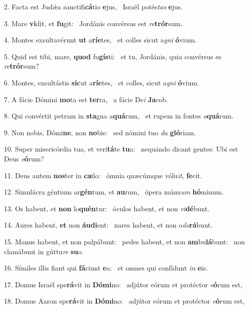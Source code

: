 2. Facta est Judǽa sanctifi\textbf{cá}tio \textbf{e}jus, \ast\  Israël potés\textit{tas} \textbf{e}jus.\

3. Mare \textbf{vi}dit, et \textbf{fu}git: \ast\  Jordánis convérsus est \textit{re}\textbf{trór}sum.\

4. Montes exsultavérunt \textbf{ut} a\textbf{rí}\textbf{e}tes, \ast\  et colles sicut a\textit{gni} \textbf{ó}vium.\

5. Quid est tibi, mare, \textbf{quod} fu\textbf{gís}ti: \ast\  et tu, Jordánis, quia convérsus es \textit{re}\textbf{trór}sum?\

6. Montes, exsultástis \textbf{sic}ut a\textbf{rí}\textbf{e}tes, \ast\  et colles, sicut a\textit{gni} \textbf{ó}vium.\

7. A fácie Dómini \textbf{mo}ta est \textbf{ter}ra, \ast\  a fácie De\textit{i} \textbf{Ja}cob.\

8. Qui convértit petram in \textbf{sta}gna a\textbf{quá}rum, \ast\  et rupem in fontes \textit{a}\textbf{quá}rum.\

9. Non nobis, Dómi\textbf{ne}, non \textbf{no}bis: \ast\  sed nómini tuo \textit{da} \textbf{gló}riam.\

10. Super misericórdia tua, et veri\textbf{tá}te \textbf{tu}a: \ast\  nequándo dicant gentes: Ubi est Deus \textit{e}\textbf{ó}rum?\

11. Deus autem \textbf{nos}ter in \textbf{cæ}lo: \ast\  ómnia quæcúmque vólu\textit{it}, \textbf{fe}cit.\

12. Simulácra géntium ar\textbf{gén}tum, et \textbf{au}rum, \ast\  ópera mánu\textit{um} \textbf{hó}minum.\

13. Os habent, et \textbf{non} lo\textbf{quén}tur: \ast\  óculos habent, et non \textit{vi}\textbf{dé}bunt.\

14. Aures habent, \textbf{et} non \textbf{áu}\textbf{di}ent: \ast\  nares habent, et non o\textit{do}\textbf{rá}bunt.\

15. Manus habent, et non palpábunt: \dag\  pedes habent, et non \textbf{am}bu\textbf{lá}bunt: \ast\  non clamábunt in gúttu\textit{re} \textbf{su}o.\

16. Símiles illis fiant qui \textbf{fá}ciunt \textbf{e}a: \ast\  et omnes qui confídunt \textit{in} \textbf{e}is.\

17. Domus Israël spe\textbf{rá}vit in \textbf{Dó}\textbf{mi}no: \ast\  adjútor eórum et protéctor \textit{e}\textbf{ó}rum est,\

18. Domus Aaron spe\textbf{rá}vit in \textbf{Dó}\textbf{mi}no: \ast\  adjútor eórum et protéctor \textit{e}\textbf{ó}rum est,\


